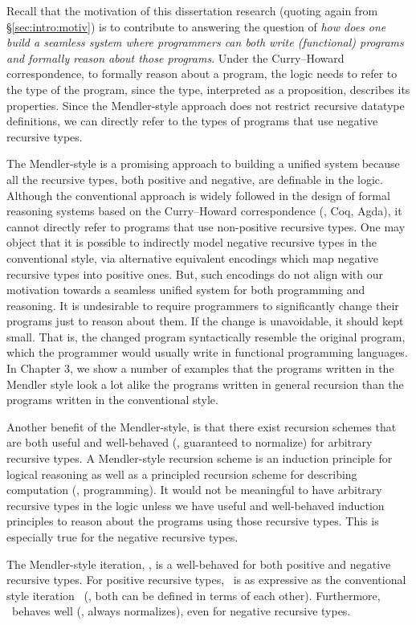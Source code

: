 Recall that the motivation of this dissertation research
(quoting again from \S\ref{sec:intro:motiv})
is to contribute to answering the question of {\em how does one build a
seamless system where programmers can both write (functional) programs and
formally reason about those programs}. Under the Curry--Howard correspondence,
to formally reason about a program, the logic needs to refer to the type of
the program, since the type, interpreted as a proposition, describes its
properties. Since the Mendler-style approach does not restrict recursive
datatype definitions, we can directly refer to the types of programs that use
negative recursive types.

The Mendler-style is a promising approach to building a unified system because
all the recursive types, both positive and negative, are definable in the
logic. Although the conventional approach is widely followed in the design of
formal reasoning systems based on the Curry--Howard correspondence (\eg, Coq,
Agda), it cannot directly refer to programs that use non-positive recursive
types. One may object that it is possible to indirectly model negative
recursive types in the conventional style, via alternative equivalent
encodings which map negative recursive types into positive ones. But, such
encodings do not align with our motivation towards a seamless unified
system for both programming and reasoning. It is undesirable to require
programmers to significantly change their programs just to reason about them.
If the change is unavoidable, it should kept small. That is,
the changed program syntactically resemble the original program,
which the programmer would usually write in functional programming languages.
In Chapter 3, we show a number of examples that the programs written in
the Mendler style look a lot alike the programs written in general recursion
than the programs written in the conventional style.

Another benefit of the Mendler-style, is that there exist recursion schemes
that are both useful and well-behaved (\ie, guaranteed to normalize) for
arbitrary recursive types. A Mendler-style recursion scheme is
an induction principle for logical reasoning as well as
a principled recursion scheme for describing computation (\ie, programming).
It would not be meaningful to have arbitrary recursive types
in the logic unless we have useful and well-behaved induction principles
to reason about the programs using those recursive types.
This is especially true for the negative recursive types.

The Mendler-style iteration, \MIt, is a well-behaved for both positive and
negative recursive types. For positive recursive types, \MIt\ is as expressive
as the conventional style iteration \It\ (\ie, both can be defined in terms of
each other). Furthermore, \MIt\ behaves well (\ie, always normalizes), even for
negative recursive types.

